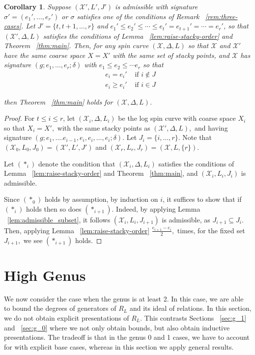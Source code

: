 \documentclass{amsart}
\theoremstyle{plain}
\newtheorem{cor}[thm]{Corollary}
\theoremstyle{definition}
\theoremstyle{remark}
\numberwithin{equation}{section}
\newcommand\sx{\mathscr X}
\newcommand{\halfcan}{L}
\begin{document}
\begin{cor}
\label{cor:raise-stacky-order}
Suppose $(\sx',L',J')$ is admissible with signature $\sigma' = (e_1',\ldots,e_r')$ or $\sigma$ satisfies one of the conditions of Remark ~\ref{rem:three-cases}. Let $J' = \{t,t+1,\ldots,r\}$ and $e_1' \leq e_2' \leq \cdots \leq e_t' = e_{t+1}' =\cdots = e_r'$,
so that $(\sx',\Delta, L)$ satisfies the conditions of Lemma ~\ref{lem:raise-stacky-order} and Theorem ~\ref{thm:main}. Then, for any spin curve $(\sx,\Delta,L)$ so that $\sx$ and $\sx'$ have the same coarse space $X = X'$ with the same set of stacky points, and $\sx$ has signature $(g;e_1,\ldots, e_r;\delta)$ with $e_1 \leq e_2 \leq \cdots e_r$ so that
\begin{align*}
	& e_i	= e_i' &\text{ if }i \notin J \\
	& e_i \ge e_i' &\text{ if } i \in J
\end{align*}

\noindent
then Theorem ~\ref{thm:main} holds for $(\sx,\Delta,L)$.
\end{cor}
\begin{proof}
For $t \leq i \leq r$, let $(\sx_i,\Delta, L_i)$ be the log spin curve with coarse space $X_i$ so that $X_i = X',$ with the same stacky points as $(\sx',\Delta,L),$ and having signature $(g; e_1, \ldots. e_{i-1}, e_i, e_i, \ldots, e_i; \delta).$ Let 
$J_i = \{i,\ldots, r\}.$ Note that $(\sx_0,L_0,J_0) = (\sx',L',J')$ and $(\sx_r ,L_r ,J_r) = (\sx, L, \{r\})$.

Let $(*_i)$ denote the condition that $(\sx_i,\Delta, L_i)$ satisfies the conditions of Lemma ~\ref{lem:raise-stacky-order} and Theorem ~\ref{thm:main}, and $(\sx_i, \halfcan_i, J_i)$ is admissible.

Since $(*_0)$ holds by assumption, by induction on $i$, it suffices to show that if $(*_i)$ holds then so does $(*_{i+1}).$ 
Indeed, by applying Lemma ~\ref{lem:admissible_subset}, it follows $(\sx_i, \halfcan_i, J_{i+1})$ is admissible, as $J_{i+1} \subseteq J_i$. Then, applying Lemma ~\ref{lem:raise-stacky-order} $\frac{e_{i+1}-e_i}{2},$ times, for the fixed set $J_{i+1},$ we see $(*_{i+1})$ holds.
\end{proof}



\section{High Genus}
\label{sec:g_high}
We now consider the case when the genus is at least 2. In this case, we are able to bound the degrees of generators of $R_\halfcan$ and its ideal of relations. In this section, we do not obtain explicit presentations of $R_\halfcan.$  This contrasts Sections ~\ref{sec:g_1} and ~\ref{sec:g_0} where we not only obtain bounds, but also obtain inductive presentations. The tradeoff is that in the genus 0 and 1 cases, we have to account for with explicit base cases, whereas in this section we apply general results.
\end{document}

